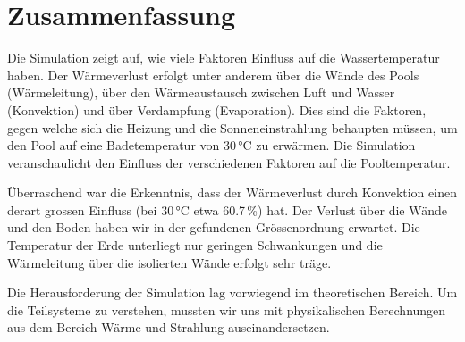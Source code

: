 \section{Zusammenfassung}
\label{sec:Zusammenfassung}
Die Simulation zeigt auf, wie viele Faktoren Einfluss auf die Wassertemperatur haben. Der Wärmeverlust erfolgt unter anderem über die Wände des Pools (Wärmeleitung), über den Wärmeaustausch zwischen Luft und Wasser (Konvektion) und über Verdampfung (Evaporation). Dies sind die Faktoren, gegen welche sich die Heizung und die Sonneneinstrahlung behaupten müssen, um den Pool auf eine Badetemperatur von 30\,°C zu erwärmen. Die Simulation veranschaulicht den Einfluss der verschiedenen Faktoren auf die Pooltemperatur.

Überraschend war die Erkenntnis, dass der Wärmeverlust durch Konvektion einen derart grossen Einfluss (bei 30\,°C etwa 60.7\,\%) hat. Der Verlust über die Wände und den Boden haben wir in der gefundenen Grössenordnung erwartet. Die Temperatur der Erde unterliegt nur geringen Schwankungen und die Wärmeleitung über die isolierten Wände erfolgt sehr träge.

Die Herausforderung der Simulation lag vorwiegend im theoretischen Bereich. Um die Teilsysteme zu verstehen, mussten wir uns mit physikalischen Berechnungen aus dem Bereich Wärme und Strahlung auseinandersetzen.
